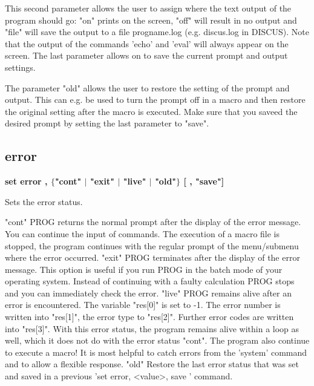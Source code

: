 \par
This second parameter  allows the user to assign where the text output 
of the program should go: "on" prints on the screen, "off" will result 
in no output and "file" will save the output to a file progname.log 
(e.g. discus.log in DISCUS). Note that the output of the commands 
'echo' and 'eval' will always appear on the screen. The last parameter 
allows on to save the current prompt and output settings. 
\par
The parameter "old" allows the user to restore the setting of the 
prompt and output. This can e.g. be used to turn the prompt off in a 
macro and then restore the original setting after the macro is executed. 
Make sure that you saveed the desired prompt by setting the last 
parameter to "save". 
\subsection*{error}
{\bf set error , $ \{$"cont" $| $ "exit" $| $ "live" $| $ "old"$\} $ [ , "save"] \par }
\par
\vspace{3pt}
Sets the error status. 
\par
\begin{MacVerbatim}
"cont"  PROG returns the normal prompt after the display of the error
        message. You can continue the input of commands.
        The execution of a macro file is stopped, the program continues
        with the regular prompt of the menu/submenu where the error occurred.
"exit"  PROG terminates after the display of the error message.
        This option is useful if you run PROG in the batch mode of your
        operating system. Instead of continuing with a faulty calculation
        PROG stops and you can immediately check the error.
"live"  PROG remains alive after an error is encountered. The variable
        "res[0]" is set to -1. The error number is written into "res[1]",
        the error type to "res[2]". Further error codes are written into
        "res[3]".
        With this error status, the program remains alive within a loop
        as well, which it does not do with the error status "cont".
        The program also continue to execute a macro!
        It is most helpful to catch errors from the 'system' command
        and to allow a flexible response.
"old"   Restore the last error status that was set and saved in a
        previous 'set error, <value>, save ' command.
\end{MacVerbatim}
